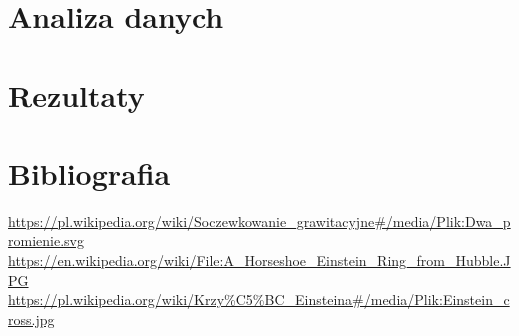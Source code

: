 \documentclass[a4paper,11pt]{article}
\begin{document}
\section{Analiza danych}

\section{Rezultaty}

\section{Bibliografia}
\begin{thebibliography}{99}
 \url{https://pl.wikipedia.org/wiki/Soczewkowanie_grawitacyjne#/media/Plik:Dwa_promienie.svg}
 \url{https://en.wikipedia.org/wiki/File:A_Horseshoe_Einstein_Ring_from_Hubble.JPG}
 \url{https://pl.wikipedia.org/wiki/Krzy%C5%BC_Einsteina#/media/Plik:Einstein_cross.jpg}
\end{thebibliography}
\end{document}
